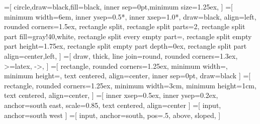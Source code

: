 =[%
    circle,draw=black,fill=black,%
    inner sep=0pt,minimum size=1.25ex,%
]%
=[%
    minimum width=6em,%
    inner ysep=0.5*\inndist,%
    inner xsep=1.0*\inndist,%
    draw=black,%
    align=left,%
    rounded corners=1.5ex,%
    rectangle split,%
    rectangle split parts=2,%
    rectangle split part fill={gray!40,white},%
    rectangle split every empty part={},%
    rectangle split empty part height=1.75ex,%
    rectangle split empty part depth=0ex,%
    rectangle split part align={center,left},%
]%
=[%
    draw,%
    thick,%
    line join=round,%
    rounded corners=1.3ex,%
    >=latex,%
    ->,%
]%
%
%
%
\let\procwidth\undefined%
\newlength\procwidth%
\settowidth{\procwidth}{\textbf{Forwarding Path}}%
\setlength\procwidth{\procwidth+\inndist+\inndist+1em}%
\setlength\procwidth{6em}%
%
\let\procheight\undefined%
\newlength\procheight%
%
\setlength\procheight{1.75\baselineskip}%
%
\newcommand\roundcorneramount{1.25ex}%
=[%
	rectangle,%
	rounded corners=\roundcorneramount,%
	minimum width=\procwidth,%
	minimum height=\procheight,%
	text centered,%
	align=center,%
	inner sep=0pt,%
	draw=black%
]%
=[%
	rectangle,%
	rounded corners=\roundcorneramount,%
	minimum width=3cm,%
	minimum height=1cm,%
	text centered,%
	align=center,%
]%
=[%
	inner xsep=0.5ex,%
	inner ysep=0.2ex,%
    anchor=south east,%
    scale=0.85,%
	text centered,%
	align=center%
]%
=[%
    input,%
    anchor=south west%
]%
=[%
    input,%
    anchor=south,%
    pos=.5,%
    above,%
    sloped,%
]%